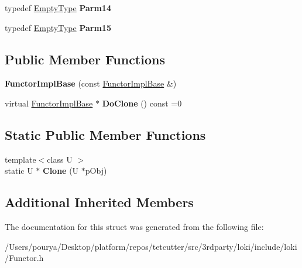 \begin{DoxyCompactItemize}
\item 
\hypertarget{structLoki_1_1Private_1_1FunctorImplBase_a314c22baca1f278c637749cb0aea3b0a}{}typedef \hyperlink{classLoki_1_1EmptyType}{Empty\+Type} {\bfseries Parm14}\label{structLoki_1_1Private_1_1FunctorImplBase_a314c22baca1f278c637749cb0aea3b0a}

\item 
\hypertarget{structLoki_1_1Private_1_1FunctorImplBase_a9d0f7451823d0a23e2de0e01005652f5}{}typedef \hyperlink{classLoki_1_1EmptyType}{Empty\+Type} {\bfseries Parm15}\label{structLoki_1_1Private_1_1FunctorImplBase_a9d0f7451823d0a23e2de0e01005652f5}

\end{DoxyCompactItemize}
\subsection*{Public Member Functions}
\begin{DoxyCompactItemize}
\item 
\hypertarget{structLoki_1_1Private_1_1FunctorImplBase_a462824f078c95e713a3661d0ec4526c5}{}{\bfseries Functor\+Impl\+Base} (const \hyperlink{structLoki_1_1Private_1_1FunctorImplBase}{Functor\+Impl\+Base} \&)\label{structLoki_1_1Private_1_1FunctorImplBase_a462824f078c95e713a3661d0ec4526c5}

\item 
\hypertarget{structLoki_1_1Private_1_1FunctorImplBase_a4e467c553da2c4467bf75c51d03df42d}{}virtual \hyperlink{structLoki_1_1Private_1_1FunctorImplBase}{Functor\+Impl\+Base} $\ast$ {\bfseries Do\+Clone} () const  =0\label{structLoki_1_1Private_1_1FunctorImplBase_a4e467c553da2c4467bf75c51d03df42d}

\end{DoxyCompactItemize}
\subsection*{Static Public Member Functions}
\begin{DoxyCompactItemize}
\item 
\hypertarget{structLoki_1_1Private_1_1FunctorImplBase_a40bd3eac72af6c3fabed34e0c27801d4}{}{\footnotesize template$<$class U $>$ }\\static U $\ast$ {\bfseries Clone} (U $\ast$p\+Obj)\label{structLoki_1_1Private_1_1FunctorImplBase_a40bd3eac72af6c3fabed34e0c27801d4}

\end{DoxyCompactItemize}
\subsection*{Additional Inherited Members}


The documentation for this struct was generated from the following file\+:\begin{DoxyCompactItemize}
\item 
/\+Users/pourya/\+Desktop/platform/repos/tetcutter/src/3rdparty/loki/include/loki/Functor.\+h\end{DoxyCompactItemize}
